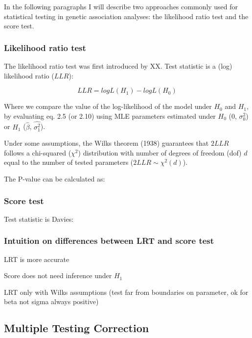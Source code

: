 
\vspace{5mm}

In the following paragraphs I will describe two approaches commonly used for statistical testing in genetic association analyses: the likelihood ratio test and the score test.

\subsubsection{Likelihood ratio test}

The likelihood ratio test was first introduced by XX. 
Test statistic is a (log) likelihood ratio ($LLR$):

\begin{equation}\label{eq18:log_likelihood_ratio}
LLR = logL(H_1) - logL(H_0)
\end{equation}

Where we compare the value of the log-likelihood of the model under $H_0$ and $H_1$, by evaluating eq. 2.5 (or 2.10) using MLE parameters estimated under $H_0$ (0, $\sigma_0^2$) or $H_1$ ($\hat{\beta}$, $\hat{\sigma_1^2}$).  

Under some assumptions, the Wilks theorem (1938) guarantees that $2LLR$ follows a chi-squared ($\chi^2$) distribution with number of degrees of freedom (dof) $d$ equal to the number of tested parameters ($2LLR \sim \chi^2(d)$).

The P-value can be calculated as:

\subsubsection{Score test}

Test statistic is 
Davies:

\subsubsection{Intuition on differences between LRT and score test}

LRT is more accurate 

Score does not need inference under $H_1$

LRT only with Wilks assumptions (test far from boundaries on parameter, ok for beta not sigma always positive)


\subsection{Multiple Testing Correction}


